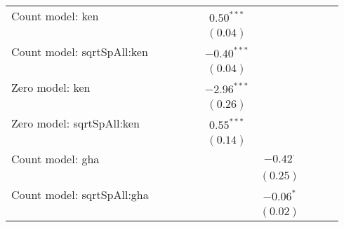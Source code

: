 \begin{center}
\begin{longtable}{l c c c c c c c c c}
Count model: ken               &                &                &               &               & $0.50^{***}$  &                 &               &               &                 \\
                               &                &                &               &               & $(0.04)$      &                 &               &               &                 \\
Count model: sqrtSpAll:ken     &                &                &               &               & $-0.40^{***}$ &                 &               &               &                 \\
                               &                &                &               &               & $(0.04)$      &                 &               &               &                 \\
Zero model: ken                &                &                &               &               & $-2.96^{***}$ &                 &               &               &                 \\
                               &                &                &               &               & $(0.26)$      &                 &               &               &                 \\
Zero model: sqrtSpAll:ken      &                &                &               &               & $0.55^{***}$  &                 &               &               &                 \\
                               &                &                &               &               & $(0.14)$      &                 &               &               &                 \\
Count model: gha               &                &                &               &               &               & $-0.42^{\cdot}$ &               &               &                 \\
                               &                &                &               &               &               & $(0.25)$        &               &               &                 \\
Count model: sqrtSpAll:gha     &                &                &               &               &               & $-0.06^{*}$     &               &               &                 \\
                               &                &                &               &               &               & $(0.02)$        &               &               &                 \\

\end{longtable}
\end{center}
